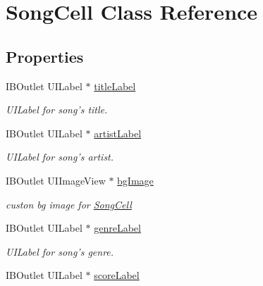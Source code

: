 \hypertarget{interface_song_cell}{\section{Song\-Cell Class Reference}
\label{interface_song_cell}
}
\subsection*{Properties}
\begin{DoxyCompactItemize}
\item 
\hypertarget{interface_song_cell_a8e0a134662f4cb7ccaefa05eb89a8564}{I\-B\-Outlet U\-I\-Label $\ast$ \hyperlink{interface_song_cell_a8e0a134662f4cb7ccaefa05eb89a8564}{title\-Label}}\label{interface_song_cell_a8e0a134662f4cb7ccaefa05eb89a8564}

\begin{DoxyCompactList}\small\item\em U\-I\-Label for song's title. \end{DoxyCompactList}\item 
\hypertarget{interface_song_cell_a5f4d80b3acc9a649d879e52f843e6fef}{I\-B\-Outlet U\-I\-Label $\ast$ \hyperlink{interface_song_cell_a5f4d80b3acc9a649d879e52f843e6fef}{artist\-Label}}\label{interface_song_cell_a5f4d80b3acc9a649d879e52f843e6fef}

\begin{DoxyCompactList}\small\item\em U\-I\-Label for song's artist. \end{DoxyCompactList}\item 
\hypertarget{interface_song_cell_aba70af84a450137df72c13c45b117f0c}{I\-B\-Outlet U\-I\-Image\-View $\ast$ \hyperlink{interface_song_cell_aba70af84a450137df72c13c45b117f0c}{bg\-Image}}\label{interface_song_cell_aba70af84a450137df72c13c45b117f0c}

\begin{DoxyCompactList}\small\item\em custon bg image for \hyperlink{interface_song_cell}{Song\-Cell} \end{DoxyCompactList}\item 
\hypertarget{interface_song_cell_a7cc4fe49be0d4422608c3d8c9e956594}{I\-B\-Outlet U\-I\-Label $\ast$ \hyperlink{interface_song_cell_a7cc4fe49be0d4422608c3d8c9e956594}{genre\-Label}}\label{interface_song_cell_a7cc4fe49be0d4422608c3d8c9e956594}

\begin{DoxyCompactList}\small\item\em U\-I\-Label for song's genre. \end{DoxyCompactList}\item 
\hypertarget{interface_song_cell_aecc623a9c8837b2511980cb2dd331cf4}{I\-B\-Outlet U\-I\-Label $\ast$ \hyperlink{interface_song_cell_aecc623a9c8837b2511980cb2dd331cf4}{score\-Label}}\label{interface_song_cell_aecc623a9c8837b2511980cb2dd331cf4}


\end{DoxyCompactItemize}
